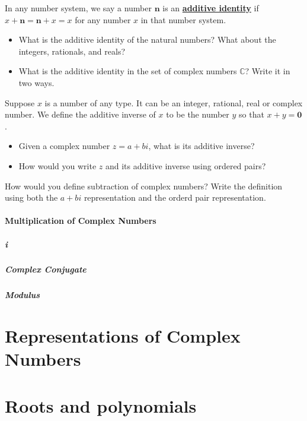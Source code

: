\documentclass[11pt]{article}
\newenvironment{task}
	{\begin{mdframed}[linecolor=lightgray, linewidth=3pt]\raggedright}
	{\end{mdframed}}
\renewcommand\emph[1]{\underline{\bf{#1}}} %
\theoremstyle{definition}
\begin{document}
\begin{task}
  In any number system, we say a number $\mathbf{n}$ is an \emph{additive identity} if $x + \mathbf{n} = \mathbf{n} + x = x$ for any number $x$ in that 
  number system.
  \begin{itemize}
    \item What is the additive identity of the natural numbers? What about the integers, rationals, and reals?
    \item What is the additive identity in the set of complex numbers $\mathbb{C}$? Write it in two ways.
  \end{itemize}
  Suppose $x$ is a number of any type. It can be an integer, rational, real or complex number. We define the additive inverse of $x$ to be the number $y$ so
  that $x+y = \textbf{0}$. 
\begin{itemize}
  \item Given a complex number $z = a+bi$, what is its additive inverse? 
  \item How would you write $z$ and its additive inverse using ordered pairs?
\end{itemize}
  How would you define subtraction of complex numbers? Write the definition using both the $a+bi$ representation and the orderd pair representation.
\end{task}

\subsection{Multiplication of Complex Numbers}

\subsubsection{i}

\subsubsection{Complex Conjugate}

\subsubsection{Modulus}



\part{Representations of Complex Numbers}

\part{Roots and polynomials}
\end{document}
